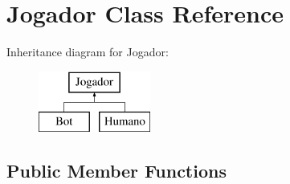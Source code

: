 \hypertarget{class_jogador}{}\section{Jogador Class Reference}
\label{class_jogador}
Inheritance diagram for Jogador\+:\begin{figure}[H]
\begin{center}
\leavevmode
\includegraphics[height=2.000000cm]{class_jogador}
\end{center}
\end{figure}
\subsection*{Public Member Functions}
